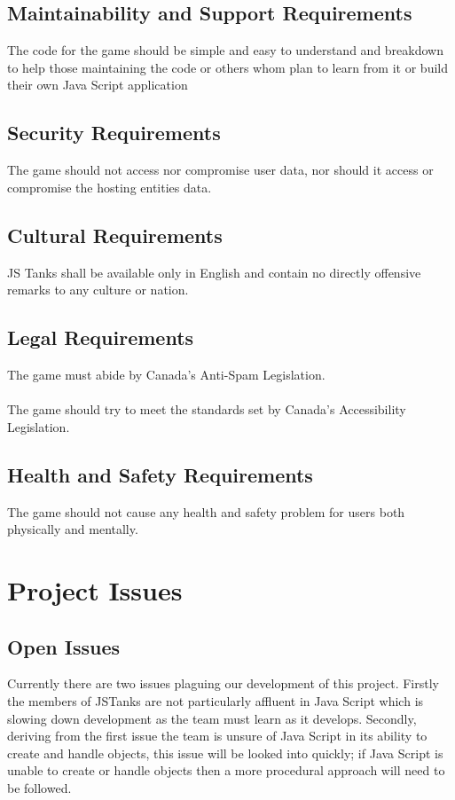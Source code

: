 \documentclass[12pt, titlepage]{article}
\begin{document}
\subsection{Maintainability and Support Requirements}
The code for the game should be simple and easy to understand and breakdown 
to help those maintaining the code or others whom plan to learn from it or 
build their own Java Script application
\subsection{Security Requirements}
The game should not access nor compromise user data, nor should it access or 
compromise the hosting entities data.
\subsection{Cultural Requirements}
JS Tanks shall be available only in English and contain no directly offensive 
remarks to any culture or nation.
\subsection{Legal Requirements}
The game must abide by Canada's Anti-Spam Legislation.
\\\\The game should try to meet the standards set by Canada's Accessibility 
Legislation.
\subsection{Health and Safety Requirements}
The game should not cause any health and safety problem for users both physically and mentally.
\section{Project Issues}
\subsection{Open Issues}
Currently there are two issues plaguing our development of this project. Firstly
the members of JSTanks are not particularly affluent in Java Script which is
slowing down development as the team must learn as it develops. Secondly,
deriving from the first issue the team is unsure of Java Script in its ability
to create and handle objects, this issue will be looked into quickly; if Java
Script is unable to create or handle objects then a more procedural approach
will need to be followed.
\end{document}
